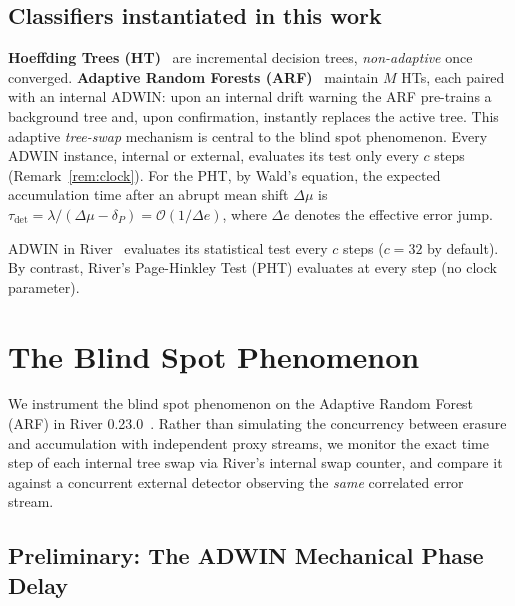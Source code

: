 \documentclass[smallextended]{svjour3}
\begin{document}
\subsection{Classifiers instantiated in this work}\label{sec:adwin}
\textbf{Hoeffding Trees (HT)}~\cite{gama_survey_2014} are incremental decision trees, \emph{non-adaptive} once converged. \textbf{Adaptive Random Forests (ARF)}~\cite{gomes_arf_2017} maintain $M$ HTs, each paired with an internal ADWIN: upon an internal drift warning the ARF pre-trains a background tree and, upon confirmation, instantly replaces the active tree. This adaptive \emph{tree-swap} mechanism is central to the blind spot phenomenon. Every ADWIN instance, internal or external, evaluates its test only every $c$ steps (Remark~\ref{rem:clock}). For the PHT, by Wald's equation, the expected accumulation time after an abrupt mean shift $\Delta\mu$ is $\tau_{\mathrm{det}} = \lambda / (\Delta\mu - \delta_P) = \mathcal{O}(1/\Delta e)$, where $\Delta e$ denotes the effective error jump.

\begin{remark}\label{rem:clock}
  ADWIN in River~\cite{montiel_river_2021} evaluates its statistical test every $c$ steps ($c=32$ by default). By contrast, River's Page-Hinkley Test (PHT) evaluates at every step (no clock parameter).
\end{remark}



\section{The Blind Spot Phenomenon}\label{sec:blindspot}

We instrument the blind spot phenomenon on the Adaptive Random Forest (ARF) in River 0.23.0~\cite{montiel_river_2021}.
Rather than simulating the concurrency between erasure and accumulation with independent proxy streams, we monitor the exact time step of each internal tree swap via River's internal swap counter, and compare it against a concurrent external detector observing the \emph{same} correlated error stream.

\subsection{Preliminary: The ADWIN Mechanical Phase Delay}\label{sec:clock}
\end{document}

